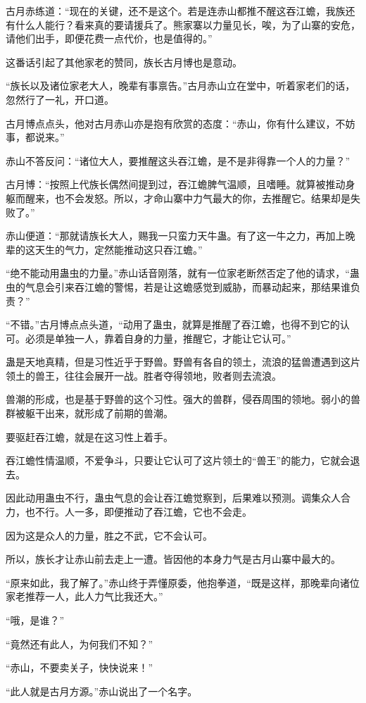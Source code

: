 \begin{this_body}
古月赤练道：“现在的关键，还不是这个。若是连赤山都推不醒这吞江蟾，我族还有什么人能行？看来真的要请援兵了。熊家寨以力量见长，唉，为了山寨的安危，请他们出手，即便花费一点代价，也是值得的。”

这番话引起了其他家老的赞同，族长古月博也是意动。

“族长以及诸位家老大人，晚辈有事禀告。”古月赤山立在堂中，听着家老们的话，忽然行了一礼，开口道。

古月博点点头，他对古月赤山亦是抱有欣赏的态度：“赤山，你有什么建议，不妨事，都说来。”

赤山不答反问：“诸位大人，要推醒这头吞江蟾，是不是非得靠一个人的力量？”

古月博：“按照上代族长偶然间提到过，吞江蟾脾气温顺，且嗜睡。就算被推动身躯而醒来，也不会发怒。所以，才命山寨中力气最大的你，去推醒它。结果却是失败了。”

赤山便道：“那就请族长大人，赐我一只蛮力天牛蛊。有了这一牛之力，再加上晚辈的这天生的气力，定然能推动这只吞江蟾。”

“绝不能动用蛊虫的力量。”赤山话音刚落，就有一位家老断然否定了他的请求，“蛊虫的气息会引来吞江蟾的警惕，若是让这蟾感觉到威胁，而暴动起来，那结果谁负责？”

“不错。”古月博点点头道，“动用了蛊虫，就算是推醒了吞江蟾，也得不到它的认可。必须是单独一人，靠着自身的力量，推醒它，才能让它认可。”

蛊是天地真精，但是习性近乎于野兽。野兽有各自的领土，流浪的猛兽遭遇到这片领土的兽王，往往会展开一战。胜者夺得领地，败者则去流浪。

兽潮的形成，也是基于野兽的这个习性。强大的兽群，侵吞周围的领地。弱小的兽群被躯干出来，就形成了前期的兽潮。

要驱赶吞江蟾，就是在这习性上着手。

吞江蟾性情温顺，不爱争斗，只要让它认可了这片领土的“兽王”的能力，它就会退去。

因此动用蛊虫不行，蛊虫气息的会让吞江蟾觉察到，后果难以预测。调集众人合力，也不行。人一多，即便推动了吞江蟾，它也不会走。

因为这是众人的力量，胜之不武，它不会认可。

所以，族长才让赤山前去走上一遭。皆因他的本身力气是古月山寨中最大的。

“原来如此，我了解了。”赤山终于弄懂原委，他抱拳道，“既是这样，那晚辈向诸位家老推荐一人，此人力气比我还大。”

“哦，是谁？”

“竟然还有此人，为何我们不知？”

“赤山，不要卖关子，快快说来！”

“此人就是古月方源。”赤山说出了一个名字。

\end{this_body}

